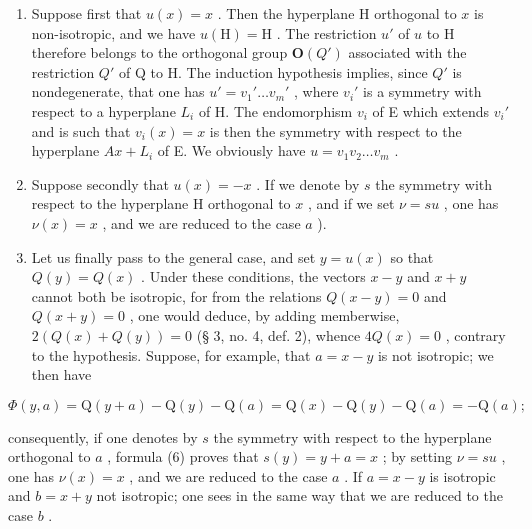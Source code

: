 \begin{enumerate}
\def\labelenumi{\alph{enumi})}
\item
  Suppose first that \(u(x) = x\) . Then the hyperplane H orthogonal to \(x\) is non-isotropic, and we have \(u(\mathrm{H}) = \mathrm{H}\) . The restriction \(u'\) of \(u\) to H therefore belongs to the orthogonal group \(\mathbf{O}(Q')\) associated with the restriction \(Q'\) of Q to H. The induction hypothesis implies, since \(Q'\) is nondegenerate, that one has \(u' = v_1' \ldots v_m'\) , where \(v_i'\) is a symmetry with respect to a hyperplane \(L_i\) of H. The endomorphism \(v_i\) of E which extends \(v_i'\) and is such that \(v_i(x) = x\) is then the symmetry with respect to the hyperplane \(Ax + L_i\) of E. We obviously have \(u = v_1v_2 \ldots v_m\) .
\item
  Suppose secondly that \(u(x) = -x\) . If we denote by \(s\) the symmetry with respect to the hyperplane H orthogonal to \(x\) , and if we set \(\nu = su\) , one has \(\nu(x) = x\) , and we are reduced to the case \(a\) ).
\item
  Let us finally pass to the general case, and set \(y = u(x)\) so that \(Q(y) = Q(x)\) . Under these conditions, the vectors \(x - y\) and \(x + y\) cannot both be isotropic, for from the relations \(Q(x - y) = 0\) and \(Q(x + y) = 0\) , one would deduce, by adding memberwise, \(2(Q(x) + Q(y)) = 0\) (§ 3, no. 4, def. 2), whence \(4Q(x) = 0\) , contrary to the hypothesis. Suppose, for example, that \(a = x - y\) is not isotropic; we then have
\end{enumerate}

\[
\Phi (y, a) = \mathrm{Q} (y + a) - \mathrm{Q} (y) - \mathrm{Q} (a) = \mathrm{Q} (x) - \mathrm{Q} (y) - \mathrm{Q} (a) = - \mathrm{Q} (a);
\]

consequently, if one denotes by \(s\) the symmetry with respect to the hyperplane orthogonal to \(a\) , formula (6) proves that \(s(y) = y + a = x\) ; by setting \(\nu = su\) , one has \(\nu(x) = x\) , and we are reduced to the case \(a\) . If \(a = x - y\) is isotropic and \(b = x + y\) not isotropic; one sees in the same way that we are reduced to the case \(b\) .

